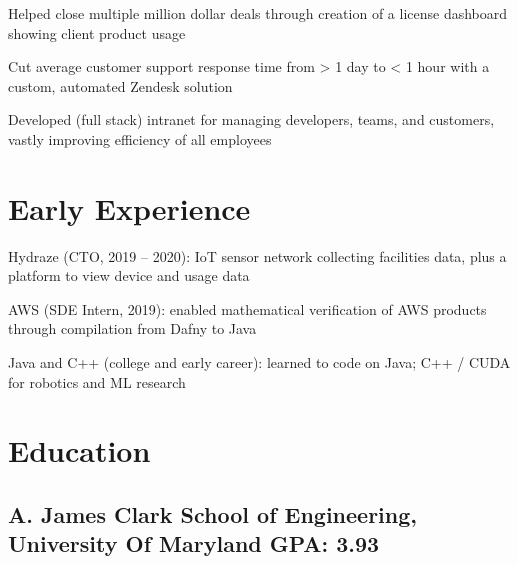 \documentclass[print]{jack-resume}
\begin{document}
\begin{tightemize}
    \item Helped close multiple million dollar deals through creation of a license dashboard showing client product usage
    \item Cut average customer support response time from > 1 day to < 1 hour with a custom, automated Zendesk solution
    \item Developed (full stack) intranet for managing developers, teams, and customers, vastly improving efficiency of all employees
\end{tightemize}
\sectionsep

\section{Early Experience}
\vspace{1.4em}
\begin{tightemize}
    \item Hydraze (CTO, 2019 -- 2020): IoT sensor network collecting facilities data, plus a platform to view device and usage data
    \item AWS (SDE Intern, 2019): enabled mathematical verification of AWS products through compilation from Dafny to Java
    \item Java and C++ (college and early career): learned to code on Java; C++ / CUDA for robotics and ML research
\end{tightemize}
\sectionsep

\section{Education}
\subsection{A. James Clark School of Engineering, University Of Maryland \hfill GPA: 3.93}

\begin{minipage}[t]{0.04\textwidth}
    \hfill
\end{minipage}
\end{document}
